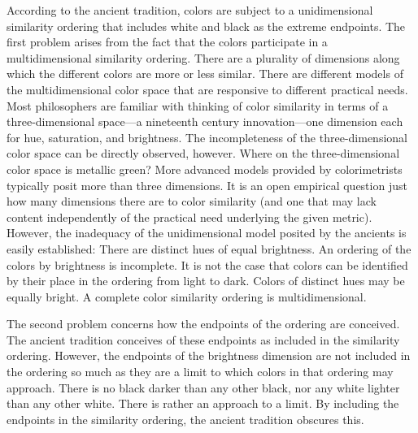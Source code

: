 According to the ancient tradition, colors are subject to a unidimensional similarity ordering that includes white and black as the extreme endpoints. The first problem arises from the fact that the colors participate in a multidimensional similarity ordering. There are a plurality of dimensions along which the different colors are more or less similar. There are different models of the multidimensional color space that are responsive to different practical needs. Most philosophers are familiar with thinking of color similarity in terms of a three-dimensional space---a nineteenth century innovation---one dimension each for hue, saturation, and brightness. The incompleteness of the three-dimensional color space can be directly observed, however. Where on the three-dimensional color space is metallic green? More advanced models provided by colorimetrists typically posit more than three dimensions. It is an open empirical question just how many dimensions there are to color similarity (and one that may lack content independently of the practical need underlying the given metric). However, the inadequacy of the unidimensional model posited by the ancients is easily established: There are distinct hues of equal brightness. An ordering of the colors by brightness is incomplete. It is not the case that colors can be identified by their place in the ordering from light to dark. Colors of distinct hues may be equally bright. A complete color similarity ordering is multidimensional.

The second problem concerns how the endpoints of the ordering are conceived. The ancient tradition conceives of these endpoints as included in the similarity ordering. However, the endpoints of the brightness dimension are not included in the ordering so much as they are a limit to which colors in that ordering may approach. There is no black darker than any other black, nor any white lighter than any other white. There is rather an approach to a limit. By including the endpoints in the similarity ordering, the ancient tradition obscures this.

